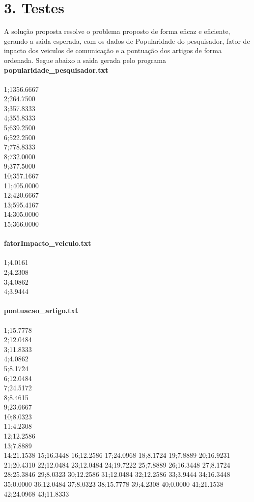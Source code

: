 \documentclass[12pt, a4paper]{article}
\begin{document}
\section*{3. Testes}
  A solução proposta resolve o problema proposto de forma eficaz e eficiente, gerando a saida esperada, com os dados de Popularidade do pesquisador, fator de inpacto dos veiculos de comunicação e a pontuação dos artigos de forma ordenada. Segue abaixo a saida gerada pelo programa\\

  \textbf{popularidade\_pesquisador.txt}\\\\
  1;1356.6667\\
  2;264.7500\\
  3;357.8333\\
  4;355.8333\\
  5;639.2500\\
  6;522.2500\\
  7;778.8333\\
  8;732.0000\\
  9;377.5000\\
  10;357.1667\\
  11;405.0000\\
  12;420.6667\\
  13;595.4167\\
  14;305.0000\\
  15;366.0000\\\\

  \textbf{fatorImpacto\_veiculo.txt}\\\\
  1;4.0161\\
  2;4.2308\\
  3;4.0862\\
  4;3.9444\\\\

  \textbf{pontuacao\_artigo.txt}\\\\
  1;15.7778\\
  2;12.0484\\
  3;11.8333\\
  4;4.0862\\
  5;8.1724\\
  6;12.0484\\
  7;24.5172\\
  8;8.4615\\
  9;23.6667\\
  10;8.0323\\
  11;4.2308\\
  12;12.2586\\
  13;7.8889\\
  14;21.1538
  15;16.3448
  16;12.2586
  17;24.0968
  18;8.1724
  19;7.8889
  20;16.9231
  21;20.4310
  22;12.0484
  23;12.0484
  24;19.7222
  25;7.8889
  26;16.3448
  27;8.1724
  28;25.3846
  29;8.0323
  30;12.2586
  31;12.0484
  32;12.2586
  33;3.9444
  34;16.3448
  35;0.0000
  36;12.0484
  37;8.0323
  38;15.7778
  39;4.2308
  40;0.0000
  41;21.1538
  42;24.0968
  43;11.8333
\end{document}
